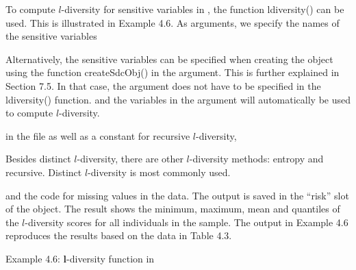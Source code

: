 \documentclass[letterpaper,10pt,english]{sphinxmanual}
\begin{document}
To compute \(l\)-diversity for sensitive variables in ,
the function ldiversity() can be used. This is illustrated in Example
4.6. As arguments, we specify the names of the sensitive
variables %
\begin{footnote}[9]\sphinxAtStartFootnote
Alternatively, the sensitive variables can be specified when
creating the  object using the function createSdcObj() in
the  argument. This is further explained in Section 7.5.
In that case, the argument  does not have to be specified
in the ldiversity() function. and the variables in the 
argument will automatically be used to compute \(l\)-diversity.
%
\end{footnote} in the file as well as a constant for
recursive \(l\)-diversity, %
\begin{footnote}[10]\sphinxAtStartFootnote
Besides distinct \(l\)-diversity, there are other
\(l\)-diversity methods: entropy and recursive. Distinct
\(l\)-diversity is most commonly used.
%
\end{footnote} and the code for
missing values in the data. The output is saved in the “risk” slot of
the  object. The result shows the minimum, maximum, mean and
quantiles of the \(l\)-diversity scores for all individuals in the
sample. The output in Example 4.6 reproduces the results based on the
data in Table 4.3.

Example 4.6: \(\mathbf{l}\)-diversity function in 
\end{document}

